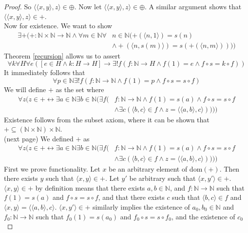 \documentclass{report}
\begin{document}
\begin{proof}
So $\langle\langle x,y\rangle,z\rangle\in\oplus$. Now let $\langle\langle x,y\rangle,z\rangle\in\oplus$. A similar argument shows that $\langle\langle x,y\rangle,z\rangle\in+$.\\
\indent Now for existence. We want to show
\begin{align*}
\exists+(+:\mathbb N\times\mathbb N\to\mathbb N\land\forall m\in\mathbb N\forall&n\in\mathbb N
(+(\langle n,1\rangle)=s(n)\\
&\land+(\langle n,s(m)\rangle)=s(+(\langle n,m\rangle))))
\end{align*}
Theorem \ref{recursion} allows us to assert
\begin{equation*}
\forall k\forall H\forall e([e\in H\land k:H\to H]\to\exists!f(f:\mathbb N\to H\land f(1)=e\land f\circ s=k\circ f))
\end{equation*}
It immediately follows that
\begin{equation*}
\forall p\in\mathbb N\exists!f(f:\mathbb N\to\mathbb N\land f(1)=p\land f\circ s=s\circ f)
\end{equation*}
We will define $+$ as the set where
\begin{align*}
\forall z(z\in+\leftrightarrow\exists a\in\mathbb N\exists b\in\mathbb N(\exists f(&f:\mathbb N\to\mathbb N\land f(1)=s(a)\land f\circ s=s\circ f\\&\land\exists c(\langle b,c\rangle\in f\land 
z=\langle\langle a,b\rangle,c\rangle))))
\end{align*}
Existence follows from the subset axiom, where it can be shown that $+\subseteq(\mathbb N\times\mathbb N)\times\mathbb N$.\\
(next page)\newpage
We defined $+$ as
\begin{align*}
\forall z(z\in+\leftrightarrow\exists a\in\mathbb N\exists b\in\mathbb N(\exists f(&f:\mathbb N\to\mathbb N\land f(1)=s(a)\land f\circ s=s\circ f\\&\land\exists c(\langle b,c\rangle\in f\land 
z=\langle\langle a,b\rangle,c\rangle))))
\end{align*}
First we prove functionality. Let $x$ be an arbitrary element of dom$(+)$. Then there exists $y$ such that $\langle x,y\rangle\in +$. Let $y'$ be arbitrary such that $\langle x,y'\rangle\in+$.
$\langle x,y\rangle\in +$ by definition means that there exists $a,b\in\mathbb N$, and $f:\mathbb N\to\mathbb N$ such that $f(1)=s(a)$ and $f\circ s=s\circ f$, and that there exists $c$ such that
$\langle b,c\rangle\in f$ and $\langle x,y\rangle=\langle\langle a,b\rangle,c\rangle$.
$\langle x,y'\rangle\in +$ similarly implies the existence of $a_0,b_0\in\mathbb N$ and $f_0:\mathbb N\to\mathbb N$ such that $f_0(1)=s(a_0)$ and $f_0\circ s=s\circ f_0$, and the existence of $c_0$ 

\end{proof}
\end{document}
